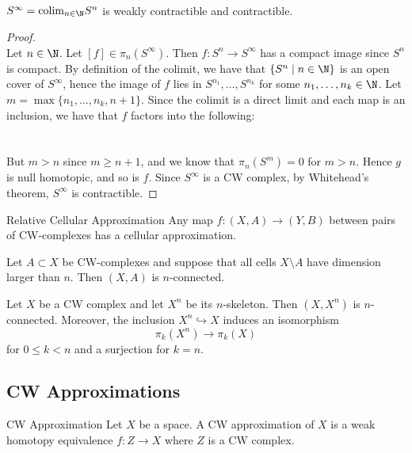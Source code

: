 \documentclass[a4paper]{article}
\begin{document}
\begin{eg}{}{}\\
$S^\infty=\text{colim}_{n\in\N}S^n$ is weakly contractible and contractible. 
\begin{proof}\\
Let $n\in\N$. Let $[f]\in\pi_n(S^\infty)$. Then $f:S^n\to S^\infty$ has a compact image since $S^n$ is compact. By definition of the colimit, we have that $\{S^n\;|\;n\in\N\}$ is an open cover of $S^\infty$, hence the image of $f$ lies in $S^{n_1},\dots,S^{n_k}$ for some $n_1,\dots,n_k\in\N$. Let $m=\max\{n_1,\dots,n_k,n+1\}$. Since the colimit is a direct limit and each map is an inclusion, we have that $f$ factors into the following: \\~\\
\\
But $m>n$ since $m\geq n+1$, and we know that $\pi_n(S^m)=0$ for $m>n$. Hence $g$ is null homotopic, and so is $f$. Since $S^\infty$ is a CW complex, by Whitehead's theorem, $S^\infty$ is contractible. 
\end{proof}
\end{eg}

\begin{thm}{Relative Cellular Approximation}{} Any map $f:(X,A)\to (Y,B)$ between pairs of CW-complexes has a cellular approximation. 
\end{thm}

\begin{crl}{}{} Let $A\subset X$ be CW-complexes and suppose that all cells $X\setminus A$ have dimension larger than $n$. Then $(X,A)$ is $n$-connected. 
\end{crl}

\begin{crl}{}{} Let $X$ be a CW complex and let $X^n$ be its $n$-skeleton. Then $(X,X^n)$ is $n$-connected. Moreover, the inclusion $X^n\hookrightarrow X$ induces an isomorphism $$\pi_k(X^n)\to\pi_k(X)$$ for $0\leq k<n$ and a surjection for $k=n$. 
\end{crl}

\subsection{CW Approximations}
\begin{defn}{CW Approximation}{} Let $X$ be a space. A CW approximation of $X$ is a weak homotopy equivalence $f:Z\to X$ where $Z$ is a CW complex. 
\end{defn}
\end{document}
